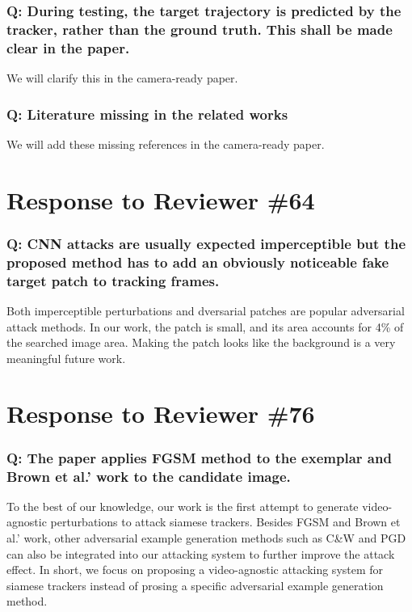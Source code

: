 \documentclass{article}
\begin{document}
\subsubsection{Q: During testing, the target trajectory is predicted by the tracker, rather than the ground truth. This shall be made clear in the paper.}
We will clarify this in the camera-ready paper.

\subsubsection{Q: Literature missing in the related works}
We will add these missing references in the camera-ready paper.

\section{Response to Reviewer \#64}

\subsubsection{Q: CNN attacks are usually expected imperceptible but the proposed method has to add an obviously noticeable fake target patch to tracking frames.}
Both imperceptible perturbations and dversarial patches \cite{patch} are popular adversarial attack methods.
In our work, the patch is small, and its area accounts for 4\% of the searched image area.
Making the patch looks like the background is a very meaningful future work.

\section{Response to Reviewer \#76}

\subsubsection{Q: The paper applies FGSM method to the exemplar and Brown et al.' work to the candidate image.}
To the best of our knowledge, our work is the first attempt to generate video-agnostic perturbations to attack siamese trackers. Besides FGSM and Brown et al.' work, other adversarial example generation methods such as C\&W \cite{carlini2017towards} and PGD \cite{PGD} can also be integrated into our attacking system to further improve the attack effect.
In short, we focus on proposing a video-agnostic attacking system for siamese trackers instead of prosing a specific adversarial example generation method.
\end{document}
